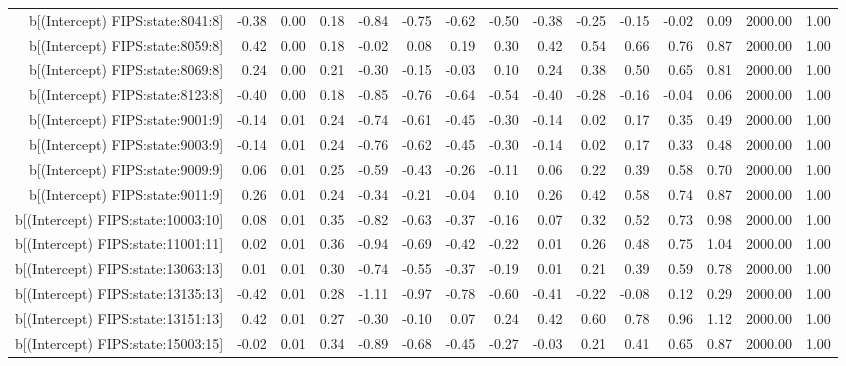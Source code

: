\begin{table}[ht]
\begin{tabular}{rrrrrrrrrrrrrrr}
  b[(Intercept) FIPS:state:8041:8] & -0.38 & 0.00 & 0.18 & -0.84 & -0.75 & -0.62 & -0.50 & -0.38 & -0.25 & -0.15 & -0.02 & 0.09 & 2000.00 & 1.00 \\ 
  b[(Intercept) FIPS:state:8059:8] & 0.42 & 0.00 & 0.18 & -0.02 & 0.08 & 0.19 & 0.30 & 0.42 & 0.54 & 0.66 & 0.76 & 0.87 & 2000.00 & 1.00 \\ 
  b[(Intercept) FIPS:state:8069:8] & 0.24 & 0.00 & 0.21 & -0.30 & -0.15 & -0.03 & 0.10 & 0.24 & 0.38 & 0.50 & 0.65 & 0.81 & 2000.00 & 1.00 \\ 
  b[(Intercept) FIPS:state:8123:8] & -0.40 & 0.00 & 0.18 & -0.85 & -0.76 & -0.64 & -0.54 & -0.40 & -0.28 & -0.16 & -0.04 & 0.06 & 2000.00 & 1.00 \\ 
  b[(Intercept) FIPS:state:9001:9] & -0.14 & 0.01 & 0.24 & -0.74 & -0.61 & -0.45 & -0.30 & -0.14 & 0.02 & 0.17 & 0.35 & 0.49 & 2000.00 & 1.00 \\ 
  b[(Intercept) FIPS:state:9003:9] & -0.14 & 0.01 & 0.24 & -0.76 & -0.62 & -0.45 & -0.30 & -0.14 & 0.02 & 0.17 & 0.33 & 0.48 & 2000.00 & 1.00 \\ 
  b[(Intercept) FIPS:state:9009:9] & 0.06 & 0.01 & 0.25 & -0.59 & -0.43 & -0.26 & -0.11 & 0.06 & 0.22 & 0.39 & 0.58 & 0.70 & 2000.00 & 1.00 \\ 
  b[(Intercept) FIPS:state:9011:9] & 0.26 & 0.01 & 0.24 & -0.34 & -0.21 & -0.04 & 0.10 & 0.26 & 0.42 & 0.58 & 0.74 & 0.87 & 2000.00 & 1.00 \\ 
  b[(Intercept) FIPS:state:10003:10] & 0.08 & 0.01 & 0.35 & -0.82 & -0.63 & -0.37 & -0.16 & 0.07 & 0.32 & 0.52 & 0.73 & 0.98 & 2000.00 & 1.00 \\ 
  b[(Intercept) FIPS:state:11001:11] & 0.02 & 0.01 & 0.36 & -0.94 & -0.69 & -0.42 & -0.22 & 0.01 & 0.26 & 0.48 & 0.75 & 1.04 & 2000.00 & 1.00 \\ 
  b[(Intercept) FIPS:state:13063:13] & 0.01 & 0.01 & 0.30 & -0.74 & -0.55 & -0.37 & -0.19 & 0.01 & 0.21 & 0.39 & 0.59 & 0.78 & 2000.00 & 1.00 \\ 
  b[(Intercept) FIPS:state:13135:13] & -0.42 & 0.01 & 0.28 & -1.11 & -0.97 & -0.78 & -0.60 & -0.41 & -0.22 & -0.08 & 0.12 & 0.29 & 2000.00 & 1.00 \\ 
  b[(Intercept) FIPS:state:13151:13] & 0.42 & 0.01 & 0.27 & -0.30 & -0.10 & 0.07 & 0.24 & 0.42 & 0.60 & 0.78 & 0.96 & 1.12 & 2000.00 & 1.00 \\ 
  b[(Intercept) FIPS:state:15003:15] & -0.02 & 0.01 & 0.34 & -0.89 & -0.68 & -0.45 & -0.27 & -0.03 & 0.21 & 0.41 & 0.65 & 0.87 & 2000.00 & 1.00 \\ 

\end{tabular}
\end{table}
